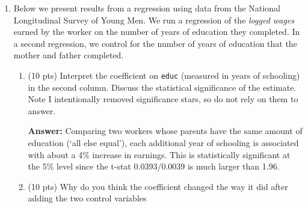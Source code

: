 \documentclass[12pt]{article}
\newcommand{\answer}[1]{{\color{blue_winged_teal}\textbf{Answer:} #1}}
\newcommand{\pts}[1]{{\color{zinc500}(#1 pts)}}
\begin{document}
\begin{enumerate}
    \begin{enumerate}
      \item \pts{10} Suppose you have data on college attendance ($D_i$), gender ($F_i=1$ indicates female), and wages ($Y_i$). 
      Explain how you would estimate the conditional expectation function using the subgroup averages approach.
      Write out all the subgroup averages you would need to compute.

      \answer{Four averages: female college attendees, female non-college attendees, male college attendees, and male non-college attendees.}

      \item \pts{10} Suppose you also observe each person's race/ethnicity, which has five
        distinct categories (e.g., White, Black, Hispanic, Asian, Other). How many
        subgroup averages would you now need to estimate?
        Explain why this approach becomes impractical as you start adding more variables?

      \answer{2 x 2 x 5 = 20 different averages. Continuing to add variables create more and more different subgroups with little to no observations per subgroup. The curse of dimensionality starts to become a concern.}
    \end{enumerate}

    \bigskip
  \item Below we present results from a regression using data from the National Longitudinal Survey of Young Men.
    We run a regression of the \emph{logged wages} earned by the worker on the number of years of education they completed.
    In a second regression, we control for the number of years of education that the mother and father completed.
    \begin{enumerate}
      \item \pts{10} Interpret the coefficient on \texttt{educ} (measured in years of schooling) in the second column.
        Discuss the statistical significance of the estimate.
        Note I intentionally removed significance stars, so do not rely on them to answer.

      \answer{Comparing two workers whose parents have the same amount of education (`all else equal'), each additional year of schooling is associated with about a 4\% increase in earnings. This is statistically significant at the 5\% level since the t-stat $0.0393 / 0.0039$ is much larger than 1.96.}

      \item \pts{10}  Why do you think the coefficient changed the way it did after adding the two control variables
      

\end{enumerate}
\end{enumerate}
\end{document}
